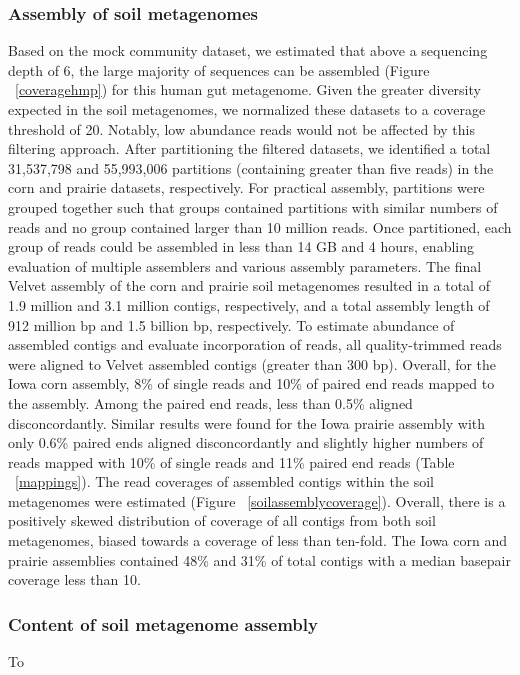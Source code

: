 \documentclass[11pt]{article} %
\begin{document}
\subsubsection{Assembly of soil metagenomes}
	Based on the mock community dataset, we estimated that above a sequencing depth of 6, the large majority of sequences can be assembled (Figure ~\ref{coveragehmp}) for this human gut metagenome.  Given the greater diversity expected in the soil metagenomes, we normalized these datasets to a coverage threshold of 20.  Notably, low abundance reads would not be affected by this filtering approach.  After partitioning the filtered datasets, we identified a total 31,537,798 and 55,993,006 partitions (containing greater than five reads) in the corn and prairie datasets, respectively.  For practical assembly, partitions were grouped together such that groups contained partitions with similar numbers of reads and no group contained larger than 10 million reads.  Once partitioned, each group of reads could be assembled in less than 14 GB and 4 hours, enabling evaluation of multiple assemblers and various assembly parameters.
	The final Velvet assembly of the corn and prairie soil metagenomes resulted in a total of 1.9 million and 3.1 million contigs, respectively, and a total assembly length of 912 million bp and 1.5 billion bp, respectively.  To estimate abundance of assembled contigs and evaluate incorporation of reads, all quality-trimmed reads were aligned to Velvet assembled contigs (greater than 300 bp).  Overall, for the Iowa corn assembly, 8\% of single reads and 10\% of paired end reads mapped to the assembly.  Among the paired end reads, less than 0.5\% aligned disconcordantly.  Similar results were found for the Iowa prairie assembly with only 0.6\% paired ends aligned disconcordantly and slightly higher numbers of reads mapped with 10\% of single reads and 11\% paired end reads (Table ~\ref{mappings}).  The read coverages of assembled contigs within the soil metagenomes were estimated (Figure ~\ref{soilassemblycoverage}).  Overall, there is a positively skewed distribution of coverage of all contigs from both soil metagenomes, biased towards a coverage of less than ten-fold.  The Iowa corn and prairie assemblies contained 48\% and 31\% of total contigs with a median basepair coverage less than 10.  
	
\subsubsection{Content of soil metagenome assembly}
	To 
\end{document}
